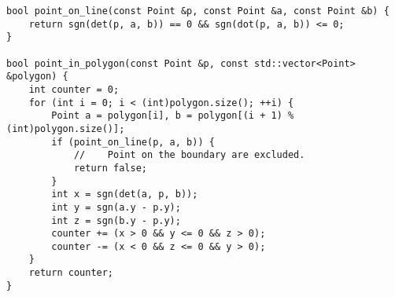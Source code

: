 \begin{lstlisting}
bool point_on_line(const Point &p, const Point &a, const Point &b) {
    return sgn(det(p, a, b)) == 0 && sgn(dot(p, a, b)) <= 0;
}

bool point_in_polygon(const Point &p, const std::vector<Point> &polygon) {
    int counter = 0;
    for (int i = 0; i < (int)polygon.size(); ++i) {
        Point a = polygon[i], b = polygon[(i + 1) % (int)polygon.size()];
        if (point_on_line(p, a, b)) {
            //    Point on the boundary are excluded.
            return false;
        }
        int x = sgn(det(a, p, b));
        int y = sgn(a.y - p.y);
        int z = sgn(b.y - p.y);
        counter += (x > 0 && y <= 0 && z > 0);
        counter -= (x < 0 && z <= 0 && y > 0);
    }
    return counter;
}
\end{lstlisting}
